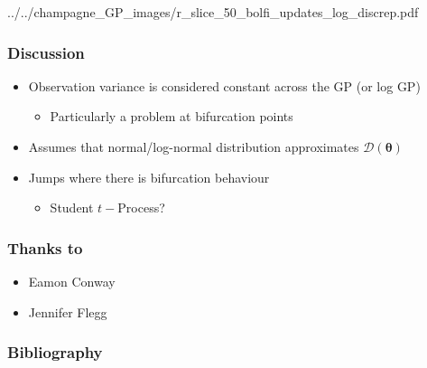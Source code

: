 \documentclass{beamer}
\begin{document}
\begin{frame}
{{            ../../champagne_GP_images/r_slice_50_bolfi_updates_log_discrep.pdf}}
\end{frame}

\begin{frame}
    \frametitle{Discussion}
    \begin{itemize}
        \item Observation variance is considered constant across the GP (or log GP)\begin{itemize}
                  \item Particularly a problem at bifurcation points
              \end{itemize}
        \item Assumes that normal/log-normal distribution approximates 
        $\mathcal{D}(\bm{\theta})$
        \item Jumps where there is bifurcation behaviour\begin{itemize}
                  \item Student $t-$Process?
              \end{itemize}
    \end{itemize}
\end{frame}

\begin{frame}
    \frametitle{Thanks to}
    \begin{itemize}
        \item Eamon Conway
        \item Jennifer Flegg
    \end{itemize}
\end{frame}

\begin{frame}
    \frametitle{Bibliography}
    \printbibliography
\end{frame}
\end{document}
